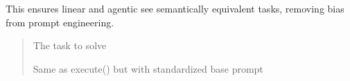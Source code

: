 \documentclass[letterpaper,10pt,english]{sphinxmanual}
\begin{document}
\begin{fulllineitems}
\begin{fulllineitems}
\sphinxAtStartPar
This ensures linear and agentic see semantically equivalent tasks,
removing bias from prompt engineering.
\begin{quote}\begin{description}
\sphinxAtStartPar
{} \textendash{} The task to solve

\sphinxAtStartPar
Same as execute() but with standardized base prompt

\end{description}\end{quote}

\end{fulllineitems}


\end{fulllineitems}

\end{document}
